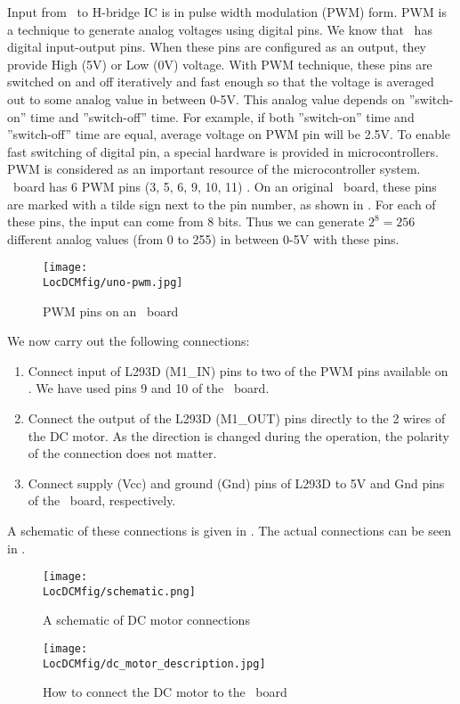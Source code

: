 Input from \arduino\ to H-bridge IC is in %
pulse width modulation (PWM) form. PWM is a technique to generate
analog voltages using digital pins. We know that \arduino\ has digital
input-output pins. When these pins are configured as an output, they
provide High (5V) or Low (0V) voltage. With PWM technique, these pins
are switched on and off iteratively and fast enough so that the
voltage is averaged out to some analog value in between 0-5V. This
analog value depends on ''switch-on'' time and ''switch-off''
time. For example, if both ''switch-on'' time and ''switch-off'' time
are equal, average voltage on PWM pin will be 2.5V. To enable fast
switching of digital pin, a special hardware is provided in
microcontrollers.  PWM is considered as an important resource of
the microcontroller system. \arduino\ board has 6 PWM pins (3, 5, 6, 9, 10, 11) \cite{arduino-pwm}. 
On an original \arduino\ board, these pins are marked with a tilde sign next to the pin number, 
as shown in . For each of these pins, the input can come from 8 bits.
Thus we can generate $2^8 = 256$ different analog values (from 0 to 255) 
in between 0-5V with these pins.

\begin{figure}
  \centering
  \texttt{[image: \\LocDCMfig/uno-pwm.jpg]}
  \caption{PWM pins on an \arduino\ board}
  \label{fig:uno-pwm}
\end{figure}

We now carry out the following connections:
\begin{enumerate}
  \item Connect input of L293D (M1\_IN) pins to two of the PWM pins
        available on \arduino.  We have used pins 9 and 10 of the \arduino\
        board. 
  \item Connect the output of the L293D (M1\_OUT) pins directly to the 2
        wires of the DC motor.  As the direction is changed during the
        operation, the polarity of the connection does not matter.
  \item Connect supply (Vcc) and ground (Gnd) pins of L293D to 5V and
        Gnd pins of the \arduino\ board, respectively.
\end{enumerate}
A schematic of these connections is given in
.  The actual connections can be seen in
\figref{fig:dcmotorconn}.


\begin{figure}
  \centering
  \texttt{[image: \\LocDCMfig/schematic.png]}
  \caption{A schematic of DC motor connections}
  \label{fig:dcm-schematic}
\end{figure}
\begin{figure}
  \centering
  \texttt{[image: \\LocDCMfig/dc\_motor\_description.jpg]}
  \caption{How to connect the DC motor to the \arduino\ board}
  \label{fig:dcmotorconn}
\end{figure}

